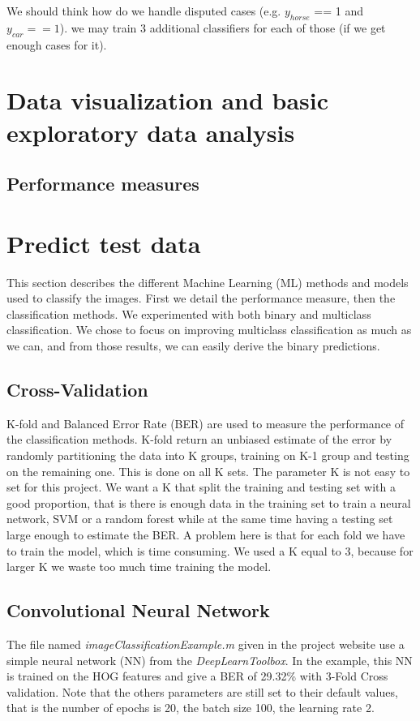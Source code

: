 \documentclass{article} %
\begin{document}
We should think how do we handle disputed cases (e.g. $y_{horse}$ == 1 and $y_{car} == 1$). we may train 3 additional classifiers for each of those (if we get enough cases for it).

\section{Data visualization and basic exploratory data analysis}


\subsection{Performance measures}

\section{Predict test data}
This section describes the different Machine Learning (ML) methods and models used to classify the images. 
First we detail the performance measure, then the classification methods.
We experimented with both binary and multiclass classification.
We chose to focus on improving multiclass classification as much as we can, and from those results, we can easily derive the binary predictions.


\subsection{Cross-Validation}

K-fold and Balanced Error Rate (BER) are used to measure the performance of the classification methods.
K-fold return an unbiased estimate of the error by randomly partitioning the data into K groups, training on K-1 group and testing on the remaining one. This is done on all K sets.
The parameter K is not easy to set for this project. 
We want a K that split the training and testing set with a good proportion, that is there is enough data in the training set to train a neural network, SVM or a random forest while at the same time having a testing set large enough to estimate the BER.
A problem here is that for each fold we have to train the model, which is time consuming. 
We used a K equal to 3, because for larger K we waste too much time training the model.

\subsection{Convolutional Neural Network}
The file named \emph{imageClassificationExample.m} given in the project website use a simple neural network (NN) from the \emph{DeepLearnToolbox}.
In the example, this NN is trained on the HOG features and give a BER of 29.32\% with 3-Fold Cross validation. Note that the others parameters are still set to their default values, that is the number of epochs is 20, the batch size 100, the learning rate 2.
\end{document}
